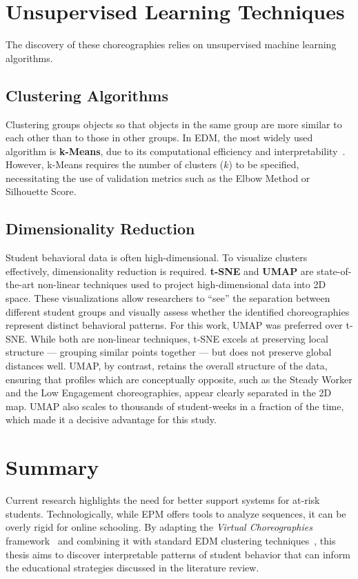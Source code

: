 \section{Unsupervised Learning Techniques}
\label{sec:algorithms}
The discovery of these choreographies relies on unsupervised machine learning algorithms.

\subsection{Clustering Algorithms}
Clustering groups objects so that objects in the same group are more similar to each other than to those in other groups.
In EDM, the most widely used algorithm is \textbf{k-Means}, due to its computational efficiency and interpretability~\cite{romero_edm_survey}.
However, k-Means requires the number of clusters ($k$) to be specified, necessitating the use of validation metrics such as the Elbow Method or Silhouette Score.

\subsection{Dimensionality Reduction}
Student behavioral data is often high-dimensional. To visualize clusters effectively, dimensionality reduction is required.
\textbf{t-SNE} and \textbf{UMAP} are state-of-the-art non-linear techniques used to project high-dimensional data into 2D space.
These visualizations allow researchers to ``see'' the separation between different student groups and visually assess whether the identified choreographies represent distinct behavioral patterns.
For this work, UMAP was preferred over t-SNE. While both are non-linear techniques, t-SNE excels at preserving local structure — grouping similar points together — but does not preserve global distances well. UMAP, by contrast, retains the overall structure of the data, ensuring that profiles which are conceptually opposite, such as the Steady Worker and the Low Engagement choreographies, appear clearly separated in the 2D map. UMAP also scales to thousands of student-weeks in a fraction of the time, which made it a decisive advantage for this study.

\section{Summary}
Current research highlights the need for better support systems for at-risk students.
Technologically, while EPM offers tools to analyze sequences, it can be overly rigid for online schooling.
By adapting the \textit{Virtual Choreographies} framework~\cite{cassola_using_2022} and combining it with standard EDM clustering techniques~\cite{romero_edm_survey}, this thesis aims to discover interpretable patterns of student behavior that can inform the educational strategies discussed in the literature review.